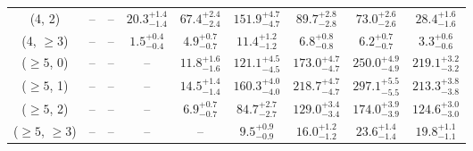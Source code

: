 \begin{table}[h!]
{\begin{tabular}{ccccccccc}
	(4, 2) & -- & -- & $20.3^{+ 1.4 }_{- 1.4 }$ & $67.4^{+ 2.4 }_{- 2.4 }$ & $151.9^{+ 4.7 }_{- 4.7 }$ & $89.7^{+ 2.8 }_{- 2.8 }$ & $73.0^{+ 2.6 }_{- 2.6 }$ & $28.4^{+ 1.6 }_{- 1.6 }$ \\[0.5ex] 
	(4, $\ge3$) & -- & -- & $1.5^{+ 0.4 }_{- 0.4 }$ & $4.9^{+ 0.7 }_{- 0.7 }$ & $11.4^{+ 1.2 }_{- 1.2 }$ & $6.8^{+ 0.8 }_{- 0.8 }$ & $6.2^{+ 0.7 }_{- 0.7 }$ & $3.3^{+ 0.6 }_{- 0.6 }$ \\[0.5ex] 
	($\ge5$, 0) & -- & -- & -- & $11.8^{+ 1.6 }_{- 1.6 }$ & $121.1^{+ 4.5 }_{- 4.5 }$ & $173.0^{+ 4.7 }_{- 4.7 }$ & $250.0^{+ 4.9 }_{- 4.9 }$ & $219.1^{+ 3.2 }_{- 3.2 }$ \\[0.5ex] 
	($\ge5$, 1) & -- & -- & -- & $14.5^{+ 1.4 }_{- 1.4 }$ & $160.3^{+ 4.0 }_{- 4.0 }$ & $218.7^{+ 4.7 }_{- 4.7 }$ & $297.1^{+ 5.5 }_{- 5.5 }$ & $213.3^{+ 3.8 }_{- 3.8 }$ \\[0.5ex] 
	($\ge5$, 2) & -- & -- & -- & $6.9^{+ 0.7 }_{- 0.7 }$ & $84.7^{+ 2.7 }_{- 2.7 }$ & $129.0^{+ 3.4 }_{- 3.4 }$ & $174.0^{+ 3.9 }_{- 3.9 }$ & $124.6^{+ 3.0 }_{- 3.0 }$ \\[0.5ex] 
	($\ge5$, $\ge3$) & -- & -- & -- & -- & $9.5^{+ 0.9 }_{- 0.9 }$ & $16.0^{+ 1.2 }_{- 1.2 }$ & $23.6^{+ 1.4 }_{- 1.4 }$ & $19.8^{+ 1.1 }_{- 1.1 }$ \\[0.5ex] 
	\hline
	\hline
\end{tabular}}
\end{table}
